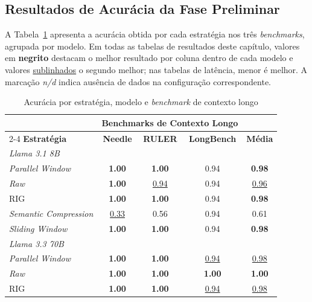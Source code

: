 \subsection{Resultados de Acurácia da Fase Preliminar}
\label{subsec:resultados-acuracia}

A Tabela~\ref{tab:acuracia} apresenta a acurácia obtida por cada estratégia nos três \textit{benchmarks}, agrupada por modelo. Em todas as tabelas de resultados deste capítulo, valores em \textbf{negrito} destacam o melhor resultado por coluna dentro de cada modelo e valores \underline{sublinhados} o segundo melhor; nas tabelas de latência, menor é melhor. A marcação \textit{n/d} indica ausência de dados na configuração correspondente.

\begin{table}[htbp]
\centering
\caption{Acurácia por estratégia, modelo e \textit{benchmark} de contexto longo}
\label{tab:acuracia}
\small
\setlength{\tabcolsep}{4.5pt}
\begin{tabular}{lccc|c}
\toprule
& \multicolumn{3}{c|}{\textbf{Benchmarks de Contexto Longo}} & \\
\cmidrule(lr){2-4}
\textbf{Estratégia} & \textbf{Needle} & \textbf{RULER} & \textbf{LongBench} & \textbf{Média} \\
\midrule
\multicolumn{5}{l}{\textit{Llama 3.1 8B}} \\
\textit{Parallel Window}      & \textbf{1.00}    & \textbf{1.00}    & 0.94         & \textbf{0.98} \\
\textit{Raw}                  & \textbf{1.00}    & \underline{0.94} & 0.94         & \underline{0.96} \\
RIG                           & \textbf{1.00}    & \textbf{1.00}    & 0.94         & \textbf{0.98} \\
\textit{Semantic Compression} & \underline{0.33} & 0.56             & 0.94         & 0.61 \\
\textit{Sliding Window}       & \textbf{1.00}    & \textbf{1.00}    & 0.94         & \textbf{0.98} \\
\midrule
\multicolumn{5}{l}{\textit{Llama 3.3 70B}} \\
\textit{Parallel Window}      & \textbf{1.00}    & \textbf{1.00}    & \underline{0.94} & \underline{0.98} \\
\textit{Raw}                  & \textbf{1.00}    & \textbf{1.00}    & \textbf{1.00}    & \textbf{1.00} \\
RIG                           & \textbf{1.00}    & \textbf{1.00}    & \underline{0.94} & \underline{0.98} \\

\end{tabular}
\end{table}

